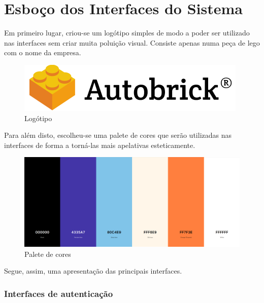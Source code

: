 
\chapter{Esboço dos Interfaces do Sistema}

    Em primeiro lugar, criou-se um logótipo simples de modo a poder ser utilizado nas interfaces sem criar muita poluição visual. Consiste apenas numa peça de lego com o nome da empresa.

    \begin{figure}[h!]
        \centering
        \includegraphics[width=0.5\linewidth]{images/autobricklogo.png}
        \caption{Logótipo}
        \label{fig:Logo}
    \end{figure}

    Para além disto, escolheu-se uma palete de cores que serão utilizadas nas interfaces de forma a torná-las mais apelativas esteticamente.

        \begin{figure}[h!]
        \centering
        \includegraphics[width=0.8\linewidth, frame]{images/ColorPallete.png}
        \caption{Palete de cores}
        \label{fig:Palete de cores}
    \end{figure}

    Segue, assim, uma apresentação das principais interfaces.

    \clearpage
    \subsection{Interfaces de autenticação}
    

